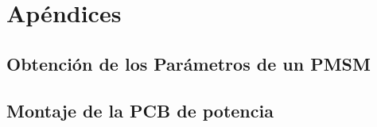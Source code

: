 \chapter{Apéndices}

\section{Obtención de los Parámetros de un PMSM}

\section{Montaje de la PCB de potencia}
